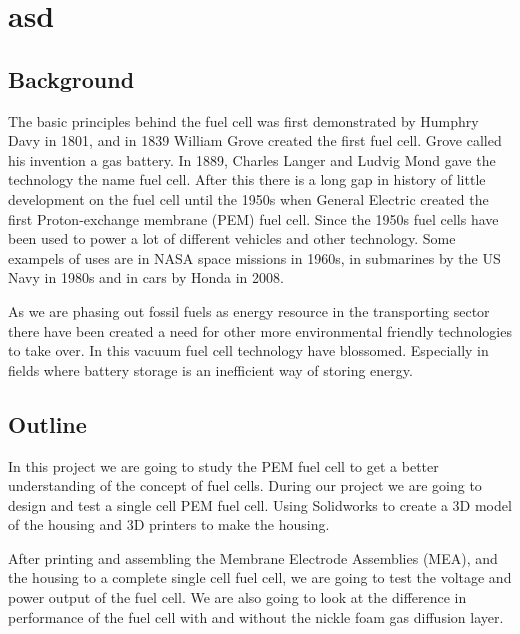 
\section{asd}
\subsection{Background}


The basic principles behind the fuel cell was first demonstrated by Humphry Davy in 1801, and in 1839 William Grove created the first fuel cell. Grove called his invention a gas battery. In 1889, Charles Langer and Ludvig Mond gave the technology the name fuel cell. After this there is a long gap in history of little development on the fuel cell until the 1950s when General Electric created the first Proton-exchange membrane (PEM) fuel cell. Since the 1950s fuel cells have been used to power a lot of different vehicles and other technology. Some exampels of uses are in NASA space missions in 1960s, in submarines by the US Navy in 1980s and in cars by Honda in 2008.

As we are phasing out fossil fuels as energy resource in the transporting sector there have been created a need for other more environmental friendly technologies to take over. In this vacuum fuel cell technology have blossomed. Especially in fields where battery storage is an inefficient way of storing energy.

\subsection{Outline}

In this project we are going to study the PEM fuel cell to get a better understanding of the concept of fuel cells. During our project we are going to design and test a single cell PEM fuel cell. Using Solidworks to create a 3D model of the housing and 3D printers to make the housing.

After printing and assembling the Membrane Electrode Assemblies (MEA), and the housing to a complete single cell fuel cell, we are going to test the voltage and power output of the fuel cell. We are also going to look at the difference in performance of the fuel cell with and without the nickle foam gas diffusion layer.


